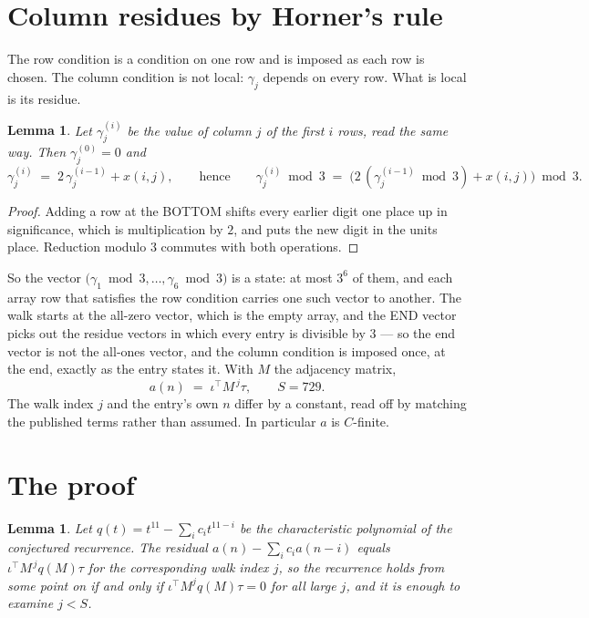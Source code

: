 \documentclass[11pt,a4paper]{article}
\theoremstyle{plain}
\newtheorem{lemma}[theorem]{Lemma}
\theoremstyle{definition}
\begin{document}
\section{Column residues by Horner's rule}

The row condition is a condition on one row and is imposed as each row is chosen. The column
condition is not local: $\gamma_j$ depends on every row. What is local is its residue.

\begin{lemma}\label{lem:horner}
Let $\gamma_j^{(i)}$ be the value of column $j$ of the first $i$ rows, read the same way.
Then $\gamma_j^{(0)}=0$ and
\[
\gamma_j^{(i)}\;=\;2\,\gamma_j^{(i-1)}+x(i,j),
\qquad\text{hence}\qquad
\gamma_j^{(i)}\bmod 3\;=\;
\bigl(2\,(\gamma_j^{(i-1)}\bmod 3)+x(i,j)\bigr)\bmod 3 .
\]
\end{lemma}

\begin{proof}
Adding a row at the BOTTOM shifts every earlier digit one place up in significance, which is
multiplication by $2$, and puts the new digit in the units place. Reduction modulo
$3$ commutes with both operations.
\end{proof}

So the vector $\bigl(\gamma_1\bmod 3,\dots,\gamma_{6}\bmod
3\bigr)$ is a state: at most $3^{6}$ of them, and each array row
that satisfies the row condition carries one such vector to another. The walk starts at the
all-zero vector, which is the empty array, and the END vector picks out the residue vectors in
which every entry is divisible by $3$ --- so the end vector is not the all-ones
vector, and the column condition is imposed once, at the end, exactly as the entry states it.
With $M$ the adjacency matrix,
\[
a(n)\;=\;\iota^{\!\top}M^{\,j}\tau ,\qquad S=729.
\]
The walk index $j$ and the entry's own $n$ differ by a constant, read off by matching the
published terms rather than assumed. In particular $a$ is $C$-finite.

\section{The proof}

\begin{lemma}\label{lem:crit}
Let $q(t)=t^{11}-\sum_i c_it^{11-i}$ be the characteristic polynomial of the
conjectured recurrence. The residual $a(n)-\sum_ic_ia(n-i)$ equals
$\iota^{\!\top}M^{\,j}q(M)\tau$ for the corresponding walk index $j$, so the recurrence
holds from some point on if and only if $\iota^{\!\top}M^{j}q(M)\tau=0$ for all large $j$,
and it is enough to examine $j<S$.
\end{lemma}
\end{document}
